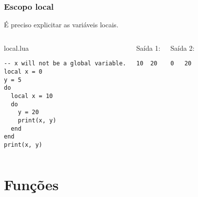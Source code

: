 \documentclass[brazil]{beamer}
\begin{document}
\begin{frame}[fragile]
  \frametitle{Escopo local}
  \pause
  \begin{center}
    É preciso explicitar as variáveis locais.
  \end{center}
  \pause
  \begin{columns}
      \begin{block}{local.lua}
        \begin{lstlisting}
-- x will not be a global variable.
local x = 0
y = 5
do
  local x = 10
  do
    y = 20
    print(x, y)
  end
end
print(x, y)
        \end{lstlisting}
      \end{block}
    \pause
      \begin{block}{Saída 1:}
        \begin{verbatim}
10  20\end{verbatim}
      \end{block}
      \pause
      \begin{block}{Saída 2:}
        \begin{verbatim}
0   20\end{verbatim}
      \end{block}
  \end{columns}
\end{frame}
\section{Funções}
\end{document}
